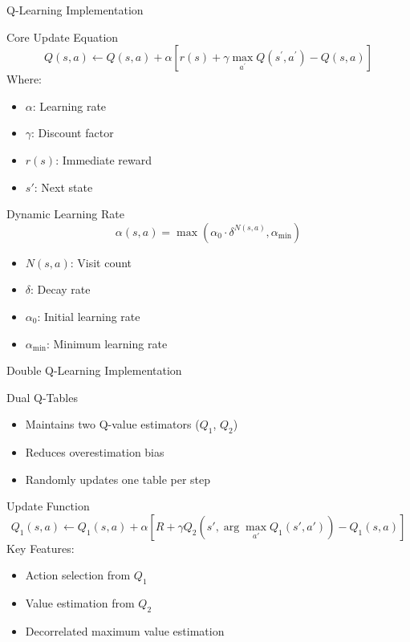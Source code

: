 \documentclass{beamer}
\begin{document}
\begin{frame}{Q-Learning Implementation}
    \begin{block}{Core Update Equation}
        \[Q(s,a)\leftarrow Q(s,a)+\alpha[r(s)+\gamma\max_{a^\prime}Q(s^\prime,a^\prime)-Q(s,a)]\]
        Where:
        \begin{itemize}
            \item $\alpha$: Learning rate
            \item $\gamma$: Discount factor
            \item $r(s)$: Immediate reward
            \item $s'$: Next state
        \end{itemize}
    \end{block}
    
    \begin{block}{Dynamic Learning Rate}
        \[\alpha(s,a) = \max(\alpha_0 \cdot \delta^{N(s,a)}, \alpha_{\min})\]
        \begin{itemize}
            \item $N(s,a)$: Visit count
            \item $\delta$: Decay rate
            \item $\alpha_0$: Initial learning rate
            \item $\alpha_{\min}$: Minimum learning rate
        \end{itemize}
    \end{block}
\end{frame}

\begin{frame}{Double Q-Learning Implementation}
    \begin{block}{Dual Q-Tables}
        \begin{itemize}
            \item Maintains two Q-value estimators ($Q_1$, $Q_2$)
            \item Reduces overestimation bias
            \item Randomly updates one table per step
        \end{itemize}
    \end{block}
    
    \begin{block}{Update Function}
        \[Q_1(s,a) \leftarrow Q_1(s,a) + \alpha[R + \gamma Q_2(s',\arg\max_{a'} Q_1(s',a')) - Q_1(s,a)]\]
        Key Features:
        \begin{itemize}
            \item Action selection from $Q_1$
            \item Value estimation from $Q_2$
            \item Decorrelated maximum value estimation
        \end{itemize}
    \end{block}
\end{frame}
\end{document}
